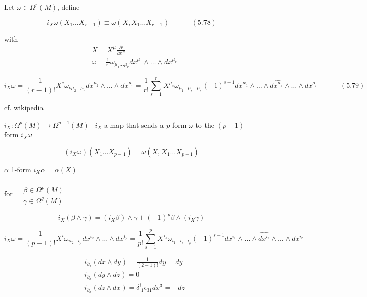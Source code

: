 \documentclass{book}
\begin{document}
Let $\omega \in \Omega^r(M)$, define

\begin{equation}
  i_X \omega(X_1 \dots X_{r-1}) \equiv \omega(X,X_1 \dots X_{r-1} ) \quad \quad \quad \, (5.78)
\end{equation}

with
\[
\begin{aligned}
  & X = X^{\mu} \frac{ \partial}{ \partial x^{ \mu} } \\ 
  &  \omega = \frac{1}{r!} \omega_{\mu_1 \dots \mu_r} dx^{\mu_1} \wedge \dots \wedge dx^{\mu_r}
\end{aligned}
\]

\begin{equation}
  i_X \omega = \frac{1}{ (r-1)!} X^{\nu} \omega_{\nu \mu_2 \dots \mu_r} dx^{\mu_2} \wedge \dots \wedge dx^{\mu_r} = \frac{1}{r!} \sum_{s=1}^r X^{\mu_s} \omega_{ \mu_1 \dots \mu_s \dots \mu_r }(-1)^{s-1} dx^{\mu_1} \wedge \dots \wedge \widehat{ dx^{\mu_s} } \wedge \dots \wedge dx^{\mu_r} \quad \quad \quad \, (5.79)
\end{equation}

cf. wikipedia

$i_X: \Omega^p(M) \to \Omega^{p-1}(M)$ \quad \quad \, $i_X$ a map that sends a $p$-form $\omega$ to the $(p-1)$ form $i_X \omega$

\[
(i_X \omega)(X_1 \dots X_{p-1}) = \omega(X,X_1 \dots X_{p-1} )
\]

$\alpha$ 1-form $i_X\alpha = \alpha(X)$


for $\begin{aligned} & \quad \\ 
  & \beta \in \Omega^p(M) \\ 
  & \gamma \in \Omega^q(M) \end{aligned}$

\[
i_X(\beta \wedge \gamma) = (i_X \beta) \wedge \gamma + (-1)^p \beta \wedge (i_X \gamma )
\]

\[
i_X \omega = \frac{1}{ (p-1)!} X^i \omega_{ii_2 \dots i_p} dx^{i_2} \wedge \dots \wedge dx^{i_p} = \frac{1}{ p!} \sum_{s=1}^p X^{i_s} \omega_{ i_1 \dots i_s \dots i_p }(-1)^{s-1} dx^{i_1} \wedge \dots \wedge \widehat{dx^{i_s}} \wedge \dots \wedge dx^{i_r}
\]

\[
\begin{aligned}
  & i_{\partial_x}(dx \wedge dy) = \frac{1}{ (2-1)!} dy = dy \\ 
  & i_{\partial_x}(dy \wedge dz) = 0 \\  
  & i_{\partial_x}( dz \wedge dx) = \delta^i_{ \, \, 1 } \epsilon_{31} dx^3 = -dz
\end{aligned}
\]
\end{document}
